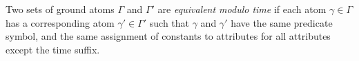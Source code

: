 


%





\begin{definition}
%
Two sets of ground atoms $\Gamma$ and $\Gamma'$ are \emph{equivalent modulo
time} if each atom $\gamma \in \Gamma$ has a corresponding atom $\gamma' \in
\Gamma'$ such that $\gamma$ and $\gamma'$ have the same predicate symbol, and
the same assignment of constants to attributes for all attributes except the
time suffix.
%
\end{definition}

